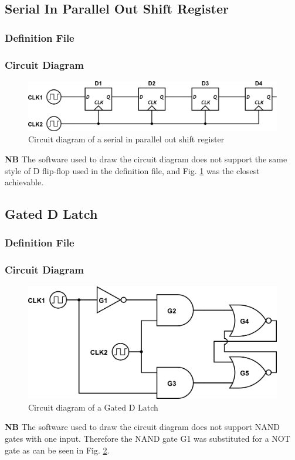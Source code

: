 \documentclass[a4paper,10pt]{article}
\begin{document}
\subsection{Serial In Parallel Out Shift Register}
\subsubsection{Definition File}

\subsubsection{Circuit Diagram}

\begin{figure}[h]
 \centering
 \includegraphics[width=12cm]{../../examples/sipo.png}
 \caption{Circuit diagram of a serial in parallel out shift register}
 \label{fig:example-sipo}
\end{figure}

\textbf{NB} The software used to draw the circuit diagram does not support the same style of D flip-flop used in the definition file, and Fig. \ref{fig:example-sipo} was the closest achievable.

\subsection{Gated D Latch}
\subsubsection{Definition File}

\subsubsection{Circuit Diagram}
\begin{figure}[h]
 \centering
 \includegraphics[width=12cm]{../../examples/gated-d-latch.png}
 \caption{Circuit diagram of a Gated D Latch}
 \label{fig:example-dlatch}
\end{figure}

\textbf{NB} The software used to draw the circuit diagram does not support NAND gates with one input. Therefore the NAND gate G1 was substituted for a NOT gate as can be seen in Fig. \ref{fig:example-dlatch}.
\end{document}
